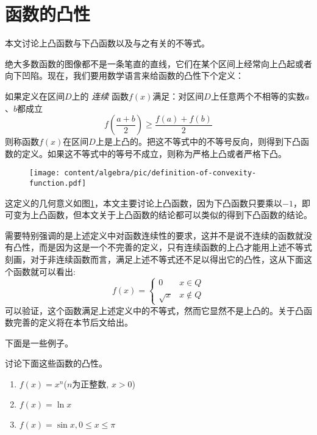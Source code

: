 
\section{函数的凸性}
\label{sec:the-convexity-of-function}

本文讨论上凸函数与下凸函数以及与之有关的不等式。

绝大多数函数的图像都不是一条笔直的直线，它们在某个区间上经常向上凸起或者向下凹陷。现在，我们要用数学语言来给函数的凸性下个定义：
\begin{definition}
 如果定义在区间$D$上的 \emph{连续} 函数$f(x)$满足：对区间$D$上任意两个不相等的实数$a$、$b$都成立
 \begin{equation}
   \label{eq:the-definition-of-convexity-function}
f(\frac{a+b}{2}) \geqslant \frac{f(a)+f(b)}{2}
 \end{equation}
则称函数$f(x)$在区间$D$上是上凸的。把这不等式中的不等号反向，则得到下凸函数的定义。如果这不等式中的等号不成立，则称为严格上凸或者严格下凸。
\end{definition}

\begin{figure}[htbp]
  \centering
\texttt{[image: content/algebra/pic/definition-of-convexity-function.pdf]}
\caption{}
\label{fig:definition-of-convexity-function}
\end{figure}

这定义的几何意义如图\ref{fig:definition-of-convexity-function}，本文主要讨论上凸函数，因为下凸函数只要乘以$-1$，即可变为上凸函数，但本文关于上凸函数的结论都可以类似的得到下凸函数的结论。

需要特别强调的是上述定义中对函数连续性的要求，这并不是说不连续的函数就没有凸性，而是因为这是一个不完善的定义，只有连续函数的上凸才能用上述不等式刻画，对于非连续函数而言，满足上述不等式还不足以得出它的凸性，这从下面这个函数就可以看出:
\begin{equation*}
  f(x) =
  \left\{
      \begin{array}{ll}
        0 & x \in Q \\
        \sqrt{x} &  x \notin Q
      \end{array}
  \right.
\end{equation*}
可以验证，这个函数满足上述定义中的不等式，然而它显然不是上凸的。关于凸函数完善的定义将在本节后文给出。

下面是一些例子。

\begin{example}
  讨论下面这些函数的凸性。
  \begin{enumerate}
  \item $f(x)=x^n$($n$为正整数, $x>0$)
  \item $f(x)=\ln{x}$
  \item $f(x)=\sin{x}, 0 \leqslant x \leqslant \pi$
  \end{enumerate}
\end{example}

